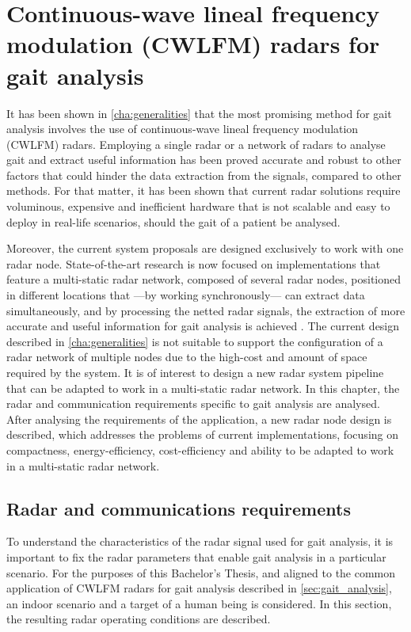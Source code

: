 \chapter{Continuous-wave lineal frequency modulation (CWLFM) radars for gait analysis}\label{sec:continuous-wave-lineal-frequency-modulation-cwlfm-radars-for-gait-analysis}

It has been shown in \cref{cha:generalities} that the most promising method for gait analysis involves the use of continuous-wave lineal frequency modulation (CWLFM) radars. Employing a single radar or a network of radars to analyse gait and extract useful information has been proved accurate and robust to other factors that could hinder the data extraction from the signals, compared to other methods. For that matter, it has been shown that current radar solutions require voluminous, expensive and inefficient hardware that is not scalable and easy to deploy in real-life scenarios, should the gait of a patient be analysed.

Moreover, the current system proposals are designed exclusively to work with one radar node. State-of-the-art research is now focused on implementations that feature a multi-static radar network, composed of several radar nodes, positioned in different locations that ---by working synchronously--- can extract data simultaneously, and by processing the netted radar signals, the extraction of more accurate and useful information for gait analysis is achieved \cite{Amin2017}. The current design described in \cref{cha:generalities} is not suitable to support the configuration of a radar network of multiple nodes due to the high-cost and amount of space required by the system. It is of interest to design a new radar system pipeline that can be adapted to work in a multi-static radar network. In this chapter, the radar and communication requirements specific to gait analysis are analysed. After analysing the requirements of the application, a new radar node design is described, which addresses the problems of current implementations, focusing on compactness, energy-efficiency, cost-efficiency and ability to be adapted to work in a multi-static radar network.

\section{Radar and communications requirements}

To understand the characteristics of the radar signal used for gait analysis, it is important to fix the radar parameters that enable gait analysis in a particular scenario. For the purposes of this Bachelor's Thesis, and aligned to the common application of CWLFM radars for gait analysis described in \cref{sec:gait_analysis}, an indoor scenario and a target of a human being is considered. In this section, the resulting radar operating conditions are described.

